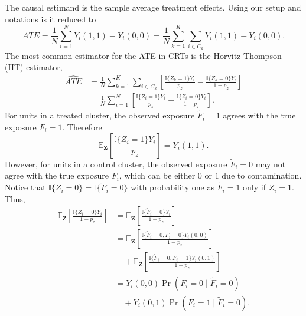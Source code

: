 \documentclass{article}[12pt]
\theoremstyle{definition}
\def \bZ {\boldsymbol{Z}}
\def \EX {\mathbb{E}}
\begin{document}
The causal estimand is the sample average treatment effects. Using our setup and notations is it reduced to
\begin{equation}
    \label{eq:ate}
    ATE = \frac{1}{N}\sum_{i=1}^N Y_i(1, 1) - Y_i(0, 0) = 
    \frac{1}{N}\sum_{k=1}^{K}\sum_{i \in C_k} Y_i(1, 1) - Y_i(0, 0).
\end{equation}
The most common estimator for the ATE in CRTs is the Horvitz-Thompson (HT) estimator,
\begin{equation}
    \label{eq:ate_ht}
    \begin{aligned}
        \widehat{ATE} 
        &= 
        \frac{1}{N}
        \sum_{k=1}^{K}
        \sum_{i \in C_k}
        \left[
        \frac{
        \mathbb{I}\{Z_k=1\}Y_i}{p_z} 
        -
        \frac{
        \mathbb{I}\{Z_k=0\}Y_i}{1 - p_z} 
        \right]
        \\ &=
        \frac{1}{N}
        \sum_{i=1}^{N}
        \left[
        \frac{  
        \mathbb{I}\{Z_i=1\}Y_i}{p_z}
        -
        \frac{
        \mathbb{I}\{Z_i=0\}Y_i}{1 - p_z}
        \right].
    \end{aligned}
\end{equation}
For units in a treated cluster, the observed exposure $\widetilde{F}_i=1$ agrees with the true exposure $F_i=1$.
Therefore
\begin{equation*}
    \EX_{\bZ} \left[\frac{
        \mathbb{I}\{Z_i=1\}Y_i}{p_z}
    \right]
    = Y_i(1,1).
\end{equation*}
However, for units in a control cluster, the observed exposure $\widetilde{F}_i=0$ 
may not agree with the true exposure $F_i$, which can be either $0$ or $1$ due to contamination.
Notice that $\mathbb{I}\{Z_i=0\} = \mathbb{I}\{\widetilde{F}_i=0\}$
with probability one as $\widetilde{F}_i=1$ only if $Z_i=1$.
Thus, 
\begin{equation*}
    \begin{aligned}
        \EX_{\bZ} \left[\frac{
            \mathbb{I}\{Z_i=0\}Y_i}{1 - p_z}
        \right]
        &= 
        \EX_{\bZ} \left[\frac{
            \mathbb{I}\{\widetilde{F}_i=0\}Y_i}{1 - p_z}
        \right]
        \\ &=
        \EX_{\bZ} \left[\frac{
            \mathbb{I}\{\widetilde{F}_i=0, F_i=0\}Y_i(0,0)}{1 - p_z}
        \right]
        \\&\quad +
        \EX_{\bZ} \left[\frac{
            \mathbb{I}\{\widetilde{F}_i=0, F_i=1\}Y_i(0,1)}{1 - p_z}
        \right]
        \\ &=
        Y_i(0,0) \Pr(F_i = 0 \mid \widetilde{F}_i=0)
        \\&\quad +
        Y_i(0,1) \Pr(F_i = 1 \mid \widetilde{F}_i=0).
    \end{aligned}
\end{equation*}
\end{document}
